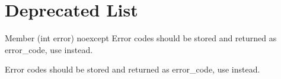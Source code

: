 \chapter{Deprecated List}
\hypertarget{deprecated}{}\label{deprecated}

\begin{DoxyRefList}
\item[Member \doxylink{namespacesimdjson_a56e8e2fa6798b9e0da80bc51ae4a5f29}{simdjson\+::error\+\_\+message} (int error) noexcept]\label{deprecated__deprecated000002}%
%
Error codes should be stored and returned as {\ttfamily error\+\_\+code}, use {\ttfamily {}} instead. 

\label{deprecated__deprecated000004}%
%
Error codes should be stored and returned as {\ttfamily error\+\_\+code}, use {\ttfamily {}} instead. 
\end{DoxyRefList}